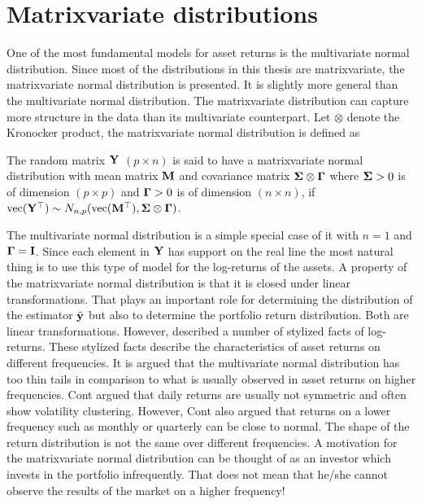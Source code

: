 \documentclass[12pt, oneside]{book}\usepackage{knitr}
\begin{document}
\section{Matrixvariate distributions}
One of the most fundamental models for asset returns is the multivariate normal distribution. 
Since most of the distributions in this thesis are matrixvariate, the matrixvariate normal distribution is presented. 
It is slightly more general than the multivariate normal distribution. 
The matrixvariate distribution can capture more structure in the data than its multivariate counterpart.
Let $\otimes$ denote the Kronocker product, the matrixvariate normal distribution is defined as
\begin{definition}\label{def:matrixnormal}
	The random matrix $\mathbf{Y}$ $(p \times n)$ is said to have a matrixvariate normal distribution with mean matrix $\mathbf{M}$ and covariance matrix $\mathbf{\Sigma} \otimes \boldsymbol{\Gamma}$ where $\mathbf{\Sigma} > 0$ is of dimension $(p \times p)$ and $\boldsymbol{\Gamma} >0$ is of dimension $(n \times n)$, if $\operatorname{vec}(\mathbf{Y}^\top) \sim N_{n,p}(\operatorname{vec}(\mathbf{M}^\top), \mathbf{\Sigma} \otimes \boldsymbol{\Gamma})$.
\end{definition}
The multivariate normal distribution is a simple special case of it with $n=1$ and $\boldsymbol{\Gamma} = \mathbf{I}$.
Since each element in $\mathbf{Y}$ has support on the real line the most natural thing is to use this type of model for the log-returns of the assets.
A property of the matrixvariate normal distribution is that it is closed under linear transformations.
That plays an important role for determining the distribution of the estimator $\bar{\mathbf{y}}$ but also to determine the portfolio return distribution.
Both are linear transformations.
However, \citet{cont2001empirical} described a number of stylized facts of log-returns. 
These stylized facts describe the characteristics of asset returns on different frequencies.  
It is argued that the multivariate normal distribution has too thin tails in comparison to what is usually observed in asset returns on higher frequencies.
Cont argued that daily returns are usually not symmetric and often show volatility clustering.
However, Cont also argued that returns on a lower frequency such as monthly or quarterly can be close to normal.
The shape of the return distribution is not the same over different frequencies. 
A motivation for the matrixvariate normal distribution can be thought of as an investor which invests in the portfolio infrequently.
That does not mean that he/she cannot observe the results of the market on a higher frequency!
\end{document}
